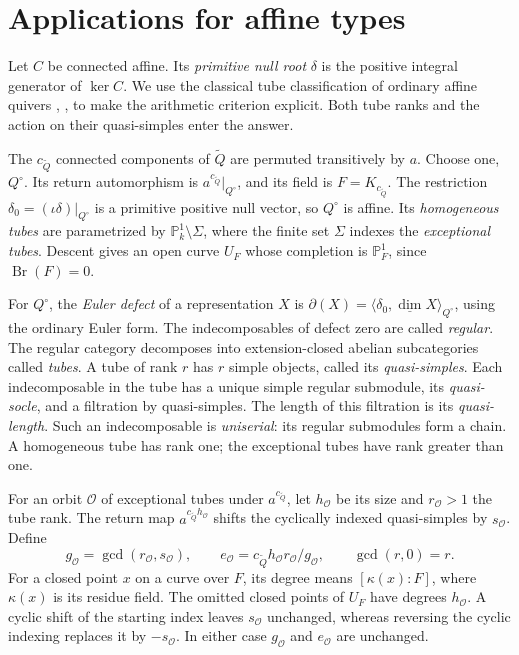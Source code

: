 \documentclass[11pt, reqno]{amsart}
\numberwithin{equation}{section}
\theoremstyle{definition}
\theoremstyle{remark}
\newcommand{\op}[1]{\operatorname{#1}}
\newcommand{\mb}[1]{\mathbb{#1}}
\newcommand{\mc}[1]{\mathcal{#1}}
\newcommand{\OO}{\mc O}
\newcommand{\dimv}{\underline{\dim}}
\newcommand{\Br}{\op{Br}}
\newcommand{\Qbar}{\widetilde Q}
\newcommand{\unfoldcomp}{{c_{\Qbar}}}
\begin{document}
\section{Applications for affine types}\label{sec:affine-strata}
Let $C$ be connected affine. Its \emph{primitive null root}
$\delta$ is the positive integral generator of $\ker C$.
We use the classical tube classification of ordinary affine quivers
\cite[Section~7.3]{DWbook}, \cite{DlabRingel}, to make the arithmetic
criterion explicit. Both tube ranks and the action on their
quasi-simples enter the answer.

The $\unfoldcomp$ connected components of $\Qbar$ are permuted transitively by $a$.
Choose one, $Q^\circ$. Its return automorphism is $a^\unfoldcomp|_{Q^\circ}$,
and its field is $F=K_\unfoldcomp$. The restriction $\delta_0=(\iota\delta)|_{Q^\circ}$ is a primitive
positive null vector, so $Q^\circ$ is affine. Its \emph{homogeneous tubes} are parametrized by
$\mb P^1_k\setminus\Sigma$, where the finite set $\Sigma$
indexes the \emph{exceptional tubes}. Descent gives an open curve $U_F$ whose
completion is $\mb P^1_F$, since $\Br(F)=0$.

For $Q^\circ$, the \emph{Euler defect} of a representation $X$ is
$\partial(X)=\langle\delta_0,\dimv X\rangle_{Q^\circ}$, using the
ordinary Euler form. The indecomposables of defect zero are called
\emph{regular}. The regular category decomposes into extension-closed
abelian subcategories called \emph{tubes}. A tube of rank $r$ has $r$
simple objects, called its \emph{quasi-simples}. Each indecomposable in
the tube has a unique simple regular submodule, its
\emph{quasi-socle}, and a filtration by quasi-simples. The length of
this filtration is its \emph{quasi-length}. Such an indecomposable
is \emph{uniserial}: its regular submodules form a chain. A homogeneous tube has
rank one; the exceptional tubes have rank greater than one.

For an orbit $\OO$ of exceptional tubes under $a^\unfoldcomp$, let $h_{\OO}$
be its size and $r_{\OO}>1$ the tube rank. The return map
$a^{\unfoldcomp h_{\OO}}$ shifts the cyclically indexed quasi-simples by
$s_{\OO}$. Define
\[ g_{\OO}=\gcd(r_{\OO},s_{\OO}),\qquad e_{\OO}=\unfoldcomp h_{\OO}r_{\OO}/g_{\OO}, \qquad\gcd(r,0)=r. \]
For a closed point $x$ on a curve over $F$, its degree means
$[\kappa(x):F]$, where $\kappa(x)$ is its residue field. The omitted
closed points of $U_F$ have degrees $h_{\OO}$.
A cyclic shift of the starting index leaves $s_{\OO}$ unchanged,
whereas reversing the cyclic indexing replaces it by $-s_{\OO}$.
In either case $g_{\OO}$ and $e_{\OO}$ are unchanged.
\end{document}
